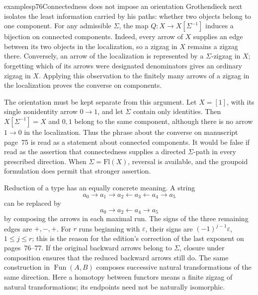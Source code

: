 \begin{dcomment}{examples}{p76}{Connectedness does not impose an orientation}
Grothendieck next isolates the least information carried by his paths: whether two objects belong to one component. For any admissible $\Sigma$, the map $Q:X\to X[\Sigma^{-1}]$ induces a bijection on connected components. Indeed, every arrow of $X$ supplies an edge between its two objects in the localization, so a zigzag in $X$ remains a zigzag there. Conversely, an arrow of the localization is represented by a $\Sigma$-zigzag in $X$; forgetting which of its arrows were designated denominators gives an ordinary zigzag in $X$. Applying this observation to the finitely many arrows of a zigzag in the localization proves the converse on components.

The orientation must be kept separate from this argument. Let $X=[1]$, with its single nonidentity arrow $0\to1$, and let $\Sigma$ contain only identities. Then $X[\Sigma^{-1}]=X$ and $0,1$ belong to the same component, although there is no arrow $1\to0$ in the localization. Thus the phrase about the converse on manuscript page~75 is read as a statement about connected components. It would be false if read as the assertion that connectedness supplies a directed $\Sigma$-path in every prescribed direction. When $\Sigma=\mathrm{Fl}(X)$, reversal is available, and the groupoid formulation does permit that stronger assertion.

Reduction of a type has an equally concrete meaning. A string
\[
 a_0\longrightarrow a_1\longrightarrow a_2
 \longleftarrow a_3\longleftarrow a_4\longrightarrow a_5
\]
can be replaced by
\[
 a_0\longrightarrow a_2\longleftarrow a_4\longrightarrow a_5
\]
by composing the arrows in each maximal run. The signs of the three remaining edges are $+,-,+$. For $r$ runs beginning with $\varepsilon$, their signs are $(-1)^{j-1}\varepsilon$, $1\leq j\leq r$; this is the reason for the edition's correction of the last exponent on pages~76--77. If the original backward arrows belong to $\Sigma$, closure under composition ensures that the reduced backward arrows still do. The same construction in $\operatorname{Fun}(A,B)$ composes successive natural transformations of the same direction. Here a homotopy between functors means a finite zigzag of natural transformations; its endpoints need not be naturally isomorphic.
\end{dcomment}


